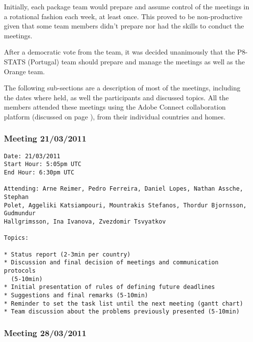 Initially, each package team would prepare and assume control of the meetings in
a rotational fashion each week, at least once. This proved to be non-productive
given that some team members didn't prepare nor had the skills to conduct the
meetings.

After a democratic vote from the team, it was decided unanimously that
the P8-STATS (Portugal) team should prepare and manage the meetings as well as
the Orange team.

The following sub-sections are a description of most of the meetings, including
the dates where held, as well the participants and discussed topics. All the members
attended these meetings using the Adobe Connect collaboration platform
(discussed on page \pageref{aconnect}), from their individual countries and homes.

\subsubsection{Meeting 21/03/2011}

\begin{verbatim}
Date: 21/03/2011
Start Hour: 5:05pm UTC
End Hour: 6:30pm UTC

Attending: Arne Reimer, Pedro Ferreira, Daniel Lopes, Nathan Assche, Stephan
Polet, Aggeliki Katsiampouri, Mountrakis Stefanos, Thordur Bjornsson, Gudmundur
Hallgrimsson, Ina Ivanova, Zvezdomir Tsvyatkov

Topics:

* Status report (2-3min per country)
* Discussion and final decision of meetings and communication protocols
  (5-10min)
* Initial presentation of rules of defining future deadlines
* Suggestions and final remarks (5-10min)
* Reminder to set the task list until the next meeting (gantt chart)
* Team discussion about the problems previously presented (5-10min)
\end{verbatim}


\subsubsection{Meeting 28/03/2011}

